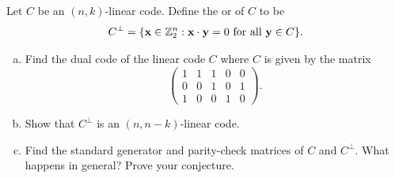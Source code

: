  
\begin{exercise}{}
Let $C$ be an $(n,k)$-linear code. Define the  or  of $C$  to be 
\[
C^\perp = \{ {\bold x} \in \mathbb{Z}_2^n :  {\bold x} \cdot {\bold y} =
0 \mbox{ for all } {\bold y} \in C \}. 
\]

\begin{enumerate}[(a)]
\item
Find the dual code of the linear code $C$ where $C$ is given by the
matrix 
\[
\left(
\begin{array}{ccccc}
1 & 1 & 1 & 0 & 0 \\
0 & 0 & 1 & 0 & 1 \\
1 & 0 & 0 & 1 & 0
\end{array}
\right).
\]
 
\item
Show that $C^\perp$ is an $(n, n-k)$-linear code.
 
\item
Find the standard generator and parity-check matrices of $C$ and
$C^\perp$. What happens in general? Prove your conjecture. 
\end{enumerate}

 \end{exercise}
 
